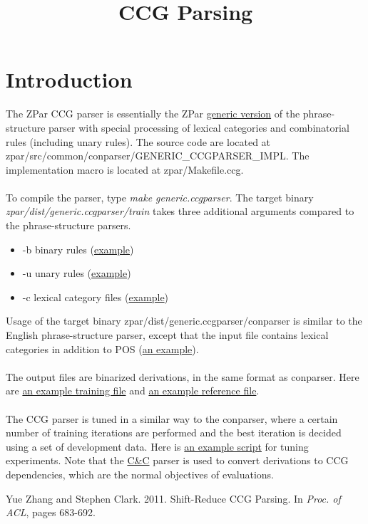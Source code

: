 \documentclass[12pt]{article}
\title{CCG Parsing}
\begin{document}
\maketitle

\section{Introduction}
The ZPar CCG parser is essentially the ZPar \href{independent.html}{generic version} of the phrase-structure parser with special processing of lexical categories and combinatorial rules (including unary rules). The source code are located at zpar/src/common/conparser/GENERIC\_CCGPARSER\_IMPL. The implementation macro is located at zpar/Makefile.ccg.
\\
\\
To compile the parser, type \textit{make generic.ccgparser}. The target binary \textit{zpar/dist/generic.ccgparser/train} takes three additional arguments compared to the phrase-structure parsers.
\begin{itemize}
\item -b binary rules (\href{ccg_files/rules.binary}{example})
\item -u unary rules (\href{ccg_files/rules.unary}{example})
\item -c lexical category files (\href{ccg_files/train.input}{example})
\end{itemize}
Usage of the target binary zpar/dist/generic.ccgparser/conparser is similar to the English phrase-structure parser, except that the input file contains lexical categories in addition to POS (\href{ccg_files/input.txt}{an example}). 
\\
\\
The output files are binarized derivations, in the same format as conparser. Here are \href{ccg_files/train.txt}{an example training file} and \href{ccg_files/reference.txt}{an example reference file}. 
\\
\\
The CCG parser is tuned in a similar way to the conparser, where a certain number of training iterations are performed and the best iteration is decided using a set of development data. Here is \href{ccg_files/test.sh}{an example script} for tuning experiments. Note that the \href{http://svn.ask.it.usyd.edu.au/trac/candc/wiki}{C\&C} parser is used to convert derivations to CCG dependencies, which are the normal objectives of evaluations.
\begin{thebibliography}{99}
Yue Zhang and Stephen Clark. 2011. Shift-Reduce CCG Parsing. In {\em Proc. of ACL}, pages 683-692.
\end{thebibliography}
\end{document}
